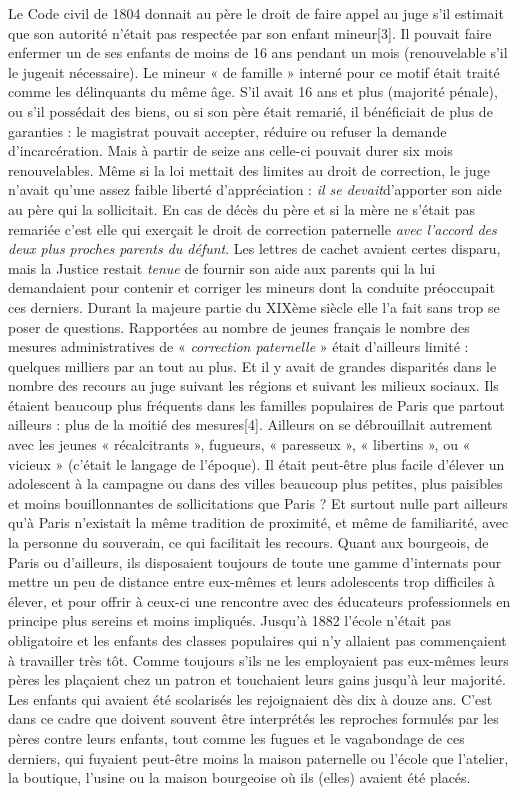  Le Code civil de 1804 donnait au père le droit de faire appel au juge s'il estimait que son autorité n'était pas respectée par son enfant mineur[3]. Il pouvait faire enfermer un de ses enfants de moins de 16 ans pendant un mois (renouvelable s'il le jugeait nécessaire). Le mineur « de famille » interné pour ce motif était traité comme les délinquants du même âge. S'il avait 16 ans et plus (majorité pénale), ou s'il possédait des biens, ou si son père était remarié, il bénéficiait de plus de garanties : le magistrat pouvait accepter, réduire ou refuser la demande d'incarcération. Mais à partir de seize ans celle-ci pouvait durer six mois renouvelables. Même si la loi mettait des limites au droit de correction, le juge n'avait qu'une assez faible liberté d'appréciation : \emph{il se devait}d'apporter son aide au père qui la sollicitait. En cas de décès du père et si la mère ne s'était pas remariée c'est elle qui exerçait le droit de correction paternelle \emph{avec l'accord des deux plus proches parents du défunt}. 
 Les lettres de cachet avaient certes disparu, mais la Justice restait \emph{tenue} de fournir son aide aux parents qui la lui demandaient pour contenir et corriger les mineurs dont la conduite préoccupait ces derniers. Durant la majeure partie du XIXème siècle elle l'a fait sans trop se poser de questions. Rapportées au nombre de jeunes français le nombre des mesures administratives de « \emph{correction paternelle} » était d'ailleurs limité : quelques milliers par an tout au plus. Et il y avait de grandes disparités dans le nombre des recours au juge suivant les régions et suivant les milieux sociaux. Ils étaient beaucoup plus fréquents dans les familles populaires de Paris que partout ailleurs : plus de la moitié des mesures[4]. Ailleurs on se débrouillait autrement avec les jeunes « récalcitrants », fugueurs, « paresseux », « libertins », ou « vicieux » (c'était le langage de l'époque). Il était peut-être plus facile d'élever un adolescent à la campagne ou dans des villes beaucoup plus petites, plus paisibles et moins bouillonnantes de sollicitations que Paris ? Et surtout nulle part ailleurs qu'à Paris n'existait la même tradition de proximité, et même de familiarité, avec la personne du souverain, ce qui facilitait les recours. Quant aux bourgeois, de Paris ou d'ailleurs, ils disposaient toujours de toute une gamme d'internats pour mettre un peu de distance entre eux-mêmes et leurs adolescents trop difficiles à élever, et pour offrir à ceux-ci une rencontre avec des éducateurs professionnels en principe plus sereins et moins impliqués.
 Jusqu'à 1882 l'école n'était pas obligatoire et les enfants des classes populaires qui n'y allaient pas commençaient à travailler très tôt. Comme toujours s'ils ne les employaient pas eux-mêmes leurs pères les plaçaient chez un patron et touchaient leurs gains jusqu'à leur majorité. Les enfants qui avaient été scolarisés les rejoignaient dès dix à douze ans. C'est dans ce cadre que doivent souvent être interprétés les reproches formulés par les pères contre leurs enfants, tout comme les fugues et le vagabondage de ces derniers, qui fuyaient peut-être moins la maison paternelle ou l'école que l'atelier, la boutique, l'usine ou la maison bourgeoise où ils (elles) avaient été placés.
